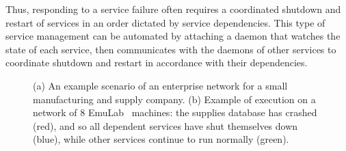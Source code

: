 \documentclass[12pt,a4paper,twoside,openright]{book}
\begin{document}
Thus, responding to a service failure often requires a coordinated shutdown and restart of services in an order dictated by service dependencies.
%
This type of service management can be automated by attaching a daemon that watches the state of each service, then communicates with the daemons of other services to coordinate shutdown and restart in accordance with their dependencies.

\begin{figure}[t!]
\centering
{}
\caption[Enterprise network for a small manufacturing and supply company]{(a) An example scenario of an enterprise network for a small manufacturing and supply company. (b) Example of execution on a network of 8 EmuLab~\cite{EmuLab} machines: the supplies database has crashed (red), and so all dependent services have shut themselves down (blue), while other services
continue to run normally (green).}
\label{f:restart}
\end{figure}
\end{document}
